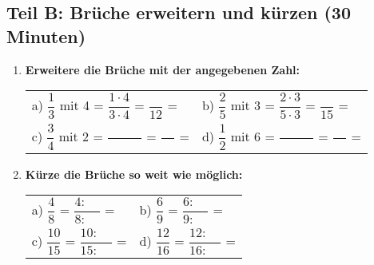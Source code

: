 \subsection*{Teil B: Brüche erweitern und kürzen (30 Minuten)}

\begin{enumerate}[resume, label=\arabic*.]
    \item \textbf{Erweitere die Brüche mit der angegebenen Zahl:}

    \vspace{0.3cm}
    \begin{tabular}{ll}
        a) $\dfrac{1}{3}$ mit 4 = $\dfrac{1 \cdot 4}{3 \cdot 4}$ = $\dfrac{\phantom{12}}{12}$ = \underline{\hspace{3cm}} & 
        b) $\dfrac{2}{5}$ mit 3 = $\dfrac{2 \cdot 3}{5 \cdot 3}$ = $\dfrac{\phantom{15}}{15}$ = \underline{\hspace{3cm}} \\[4ex]
        c) $\dfrac{3}{4}$ mit 2 = $\dfrac{\phantom{00 \cdot 00}}{\phantom{00 \cdot 00}}$ = $\dfrac{\phantom{00}}{\phantom{00}}$ = \underline{\hspace{3cm}} & 
        d) $\dfrac{1}{2}$ mit 6 = $\dfrac{\phantom{00 \cdot 00}}{\phantom{00 \cdot 00}}$ = $\dfrac{\phantom{00}}{\phantom{00}}$ = \underline{\hspace{3cm}}
    \end{tabular}

    \vspace{1cm}

    \item \textbf{Kürze die Brüche so weit wie möglich:}

    \vspace{0.3cm}
    \begin{tabular}{ll}
        a) $\dfrac{4}{8}$ = $\dfrac{4: \phantom{00}}{8: \phantom{00} }$ = \underline{\hspace{3cm}} & 
        b) $\dfrac{6}{9}$ = $\dfrac{6: \phantom{00}}{9: \phantom{00}}$ = \underline{\hspace{3cm}} \\[4ex]
        c) $\dfrac{10}{15}$ = $\dfrac{10: \phantom{00}}{15: \phantom{00}}$ = \underline{\hspace{3cm}} & 
        d) $\dfrac{12}{16}$ = $\dfrac{12: \phantom{00}}{16: \phantom{00}}$ = \underline{\hspace{3cm}}
    \end{tabular}

    \vspace{1cm}


\end{enumerate}
